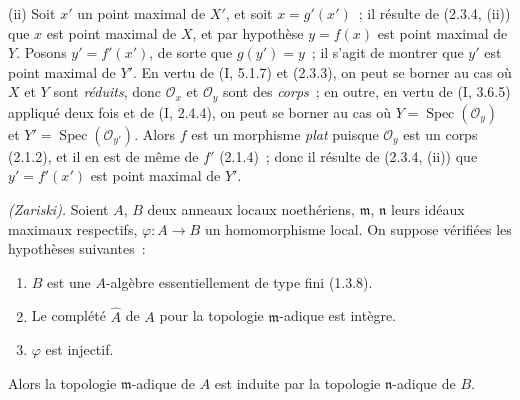 (ii) Soit $x'$ un point maximal de $X'$, et soit $x=g'(x')$~; il résulte de
(2.3.4, (ii)) que $x$ est point maximal de $X$, et par hypothèse $y=f(x)$ est
point maximal de $Y$. Posons $y'=f'(x')$, de sorte que $g(y')=y$~; il s'agit
de montrer que $y'$ est point maximal de $Y'$. En vertu de (I, 5.1.7) et
(2.3.3), on peut se borner au cas où $X$ et $Y$ sont \emph{réduits}, donc
$\mathcal O_x$ et $\mathcal O_y$ sont des \emph{corps}~; en outre, en vertu de
(I, 3.6.5) appliqué deux fois et de (I, 2.4.4), on peut se borner au cas où
$Y=\operatorname{Spec}(\mathcal O_y)$ et
$Y'=\operatorname{Spec}(\mathcal O_{y'})$. Alors $f$ est un morphisme
\emph{plat} puisque $\mathcal O_y$ est un corps (2.1.2), et il en est de même
de $f'$ (2.1.4)~; donc il résulte de (2.3.4, (ii)) que $y'=f'(x')$ est point
maximal de $Y'$.

\begin{corollary}[2.3.8]
\label{IV.2.3.8-fr}
\emph{(Zariski).} Soient $A$, $B$ deux anneaux locaux noethériens,
$\mathfrak m$, $\mathfrak n$ leurs idéaux maximaux respectifs,
$\varphi:A\to B$ un homomorphisme local. On suppose vérifiées les hypothèses
suivantes~:
\begin{enumerate}
  \item[$1^\circ$] $B$ est une $A$-algèbre essentiellement de type fini
  (1.3.8).
  \item[$2^\circ$] Le complété $\widehat A$ de $A$ pour la topologie
  $\mathfrak m$-adique est intègre.
  \item[$3^\circ$] $\varphi$ est injectif.
\end{enumerate}
Alors la topologie $\mathfrak m$-adique de $A$ est induite par la topologie
$\mathfrak n$-adique de $B$.
\end{corollary}

